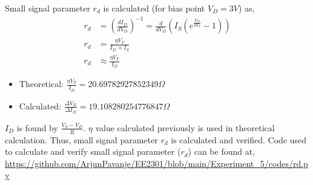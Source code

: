 \documentclass[12pt,a4paper]{article}
\begin{document}
\newline Small signal parameter $r_d$ is calculated (for bias point $V_D = 3V$) as,
\begin{align*}
    r_d &= \left(\frac{dI_D}{dV_D}\right)^{-1} = \frac{d}{dV_D}(I_S(e^{\frac{V_D}{\eta V_T}} - 1))\\
    r_d &= \frac{\eta V_T}{I_D + I_S}\\
    r_d &\approx \frac{\eta V_T}{I_D}
\end{align*}

\begin{itemize}
    \item Theoretical: $\frac{\eta V_T}{I_D} = 20.69782927852349\Omega$
    \item Calculated: $\frac{\Delta V_D}{\Delta I_D} = 19.108280254776847\Omega$
\end{itemize}
$I_D$ is found by $\frac{V_S - V_D}{R}$. $\eta$ value calculated previously is used in theoretical calculation. Thus, small signal parameter $r_d$ is calculated and verified.
Code used to calculate and verify small signal parameter ($r_d$) can be found at, \url{https://github.com/ArjunPavanje/EE2301/blob/main/Experiment_5/codes/rd.py}
\end{document}
